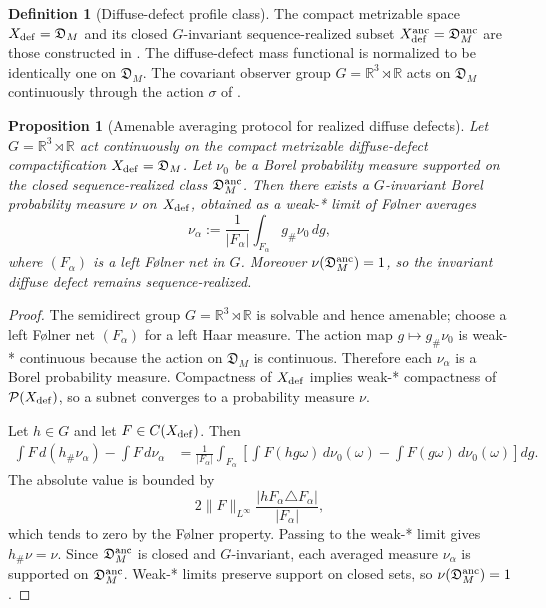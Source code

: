 \documentclass[11pt]{amsart}
\numberwithin{equation}{section}
\theoremstyle{plain}
\newtheorem{proposition}[proposition]{Proposition}
\theoremstyle{definition}
\newtheorem{definition}[definition]{Definition}
\theoremstyle{remark}
\begin{document}
\begin{definition}[Diffuse-defect profile class]
\label{def:diffuse-defect-compactification}
The compact metrizable space \(X_{\rm def}=\mathfrak D_M\) and its closed
\(G\)-invariant sequence-realized subset \(X_{\rm def}^{\rm anc}=
\mathfrak D_M^{\rm anc}\) are those constructed in
.  The
diffuse-defect mass functional is normalized to be identically one on
\(\mathfrak D_M\).  The covariant observer group
\(G=\mathbb R^3\rtimes\mathbb R\) acts on \(\mathfrak D_M\) continuously
through the action \(\sigma\) of
.
\end{definition}

\begin{proposition}[Amenable averaging protocol for realized diffuse defects]
\label{prop:amenable-averaging-realized-diffuse-defects}
Let \(G=\mathbb R^3\rtimes\mathbb R\) act continuously on the compact metrizable
diffuse-defect compactification \(X_{\rm def}=\mathfrak D_M\).  Let \(\nu_0\) be a Borel
probability measure supported on the closed sequence-realized class
\(\mathfrak D_M^{\rm anc}\).  Then there exists a \(G\)-invariant Borel
probability measure \(\nu\) on \(X_{\rm def}\), obtained as a weak-* limit of
Følner averages
\[
   \nu_\alpha
   :=
   \frac1{|F_\alpha|}
   \int_{F_\alpha} g_\#\nu_0\,dg,
\]
where \((F_\alpha)\) is a left Følner net in \(G\).  Moreover
\(\nu(\mathfrak D_M^{\rm anc})=1\), so the invariant diffuse defect remains
sequence-realized.
\end{proposition}

\begin{proof}
The semidirect group \(G=\mathbb R^3\rtimes\mathbb R\) is solvable and hence
amenable; choose a left Følner net \((F_\alpha)\) for a left Haar measure.  The
action map \(g\mapsto g_\#\nu_0\) is weak-* continuous because the action on
\(\mathfrak D_M\) is continuous.  Therefore each \(\nu_\alpha\) is a Borel
probability measure.  Compactness of \(X_{\rm def}\) implies weak-* compactness
of \(\mathcal P(X_{\rm def})\), so a subnet converges to a probability measure
\(\nu\).

Let \(h\in G\) and let \(F\in C(X_{\rm def})\).  Then
\[
\begin{aligned}
   \int F\,d(h_\#\nu_\alpha)-\int F\,d\nu_\alpha
   &=
   \frac1{|F_\alpha|}
   \int_{F_\alpha}\left[
      \int F(hg\omega)\,d\nu_0(\omega)
      -
      \int F(g\omega)\,d\nu_0(\omega)
   \right]dg .
\end{aligned}
\]
The absolute value is bounded by
\[
   2\|F\|_{L^\infty}
   \frac{|hF_\alpha\triangle F_\alpha|}{|F_\alpha|},
\]
which tends to zero by the Følner property.  Passing to the weak-* limit gives
\(h_\#\nu=\nu\).  Since \(\mathfrak D_M^{\rm anc}\) is closed and \(G\)-invariant,
each averaged measure \(\nu_\alpha\) is supported on
\(\mathfrak D_M^{\rm anc}\).  Weak-* limits preserve support on closed sets, so
\(\nu(\mathfrak D_M^{\rm anc})=1\).
\end{proof}
\end{document}
